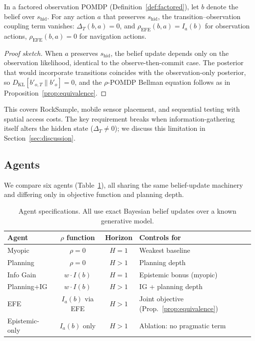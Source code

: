 \documentclass[runningheads]{llncs}
\begin{document}
\begin{proposition}
\label{prop:factored}
In a factored observation POMDP (Definition~\ref{def:factored}), let $b$ denote the belief over $s_{\mathrm{hid}}$. For any action $a$ that preserves $s_{\mathrm{hid}}$, the transition--observation coupling term vanishes: $\Delta_T(b, a) = 0$, and $\rho_{\mathrm{EFE}}(b, a) = I_a(b)$ for observation actions, $\rho_{\mathrm{EFE}}(b, a) = 0$ for navigation actions.
\end{proposition}
\begin{proof}[Proof sketch]
When $a$ preserves $s_{\mathrm{hid}}$, the belief update depends only on the observation likelihood, identical to the observe-then-commit case. The posterior that would incorporate transitions coincides with the observation-only posterior, so $D_{\mathrm{KL}}[b'_{o,T} \| b'_o] = 0$, and the $\rho$-POMDP Bellman equation follows as in Proposition~\ref{prop:equivalence}.
\end{proof}

This covers RockSample, mobile sensor placement, and sequential testing with spatial access costs. The key requirement breaks when information-gathering itself alters the hidden state ($\Delta_T \neq 0$); we discuss this limitation in Section~\ref{sec:discussion}.

\subsection{Agents}

We compare six agents (Table~\ref{tab:agents}), all sharing the same belief-update machinery and differing only in objective function and planning depth.

\begin{table}[ht]
\centering
\caption{Agent specifications. All use exact Bayesian belief updates over a known generative model.}
\label{tab:agents}
\begin{small}
\begin{tabular}{lccl}
\toprule
Agent & $\rho$ function & Horizon & Controls for \\
\midrule
Myopic & $\rho = 0$ & $H{=}1$ & Weakest baseline \\
Planning & $\rho = 0$ & $H > 1$ & Planning depth \\
Info Gain & $w \cdot I(b)$ & $H{=}1$ & Epistemic bonus (myopic) \\
Planning+IG & $w \cdot I(b)$ & $H > 1$ & IG + planning depth \\
EFE & $I_a(b)$ via EFE & $H > 1$ & Joint objective (Prop.~\ref{prop:equivalence}) \\
Epistemic-only & $I_a(b)$ only & $H > 1$ & Ablation: no pragmatic term \\
\bottomrule
\end{tabular}
\end{small}
\end{table}
\end{document}
